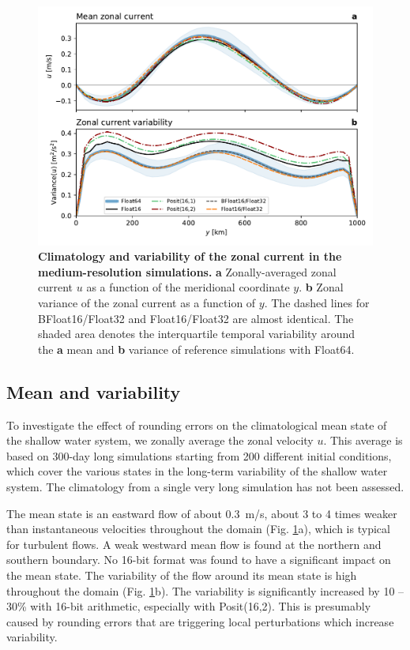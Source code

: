 \begin{figure}
\includegraphics[width=1\textwidth]{Figures/swm/meanvar_u.pdf}
\caption{\textbf{Climatology and variability of the zonal current in the medium-resolution simulations.} \textbf{a} Zonally-averaged zonal
current $u$ as a function of the meridional coordinate $y$. \textbf{b} Zonal variance of the zonal current as a function of $y$. The dashed
lines for BFloat16/Float32 and Float16/Float32 are almost identical. The shaded area denotes the interquartile temporal variability around
the \textbf{a} mean and \textbf{b} variance of reference simulations with Float64.}
\label{fig:mean}
\end{figure}

\subsection{Mean and variability}

To investigate the effect of rounding errors on the climatological mean state of the shallow water system, we zonally average the zonal
velocity $u$. This average is based on 300-day long simulations starting from 200 different initial conditions, which cover the various
states in the long-term variability of the shallow water system. The climatology from a single very long simulation has not been assessed.

The mean state is an eastward flow of about 0.3~m/s, about 3 to 4 times weaker than instantaneous velocities throughout the domain
(Fig. \ref{fig:mean}a), which is typical for turbulent flows. A weak westward mean flow is found at the northern and southern boundary. 
No 16-bit format was found to have a significant impact on the mean state. The variability of the flow around its mean state is high
throughout the domain (Fig. \ref{fig:mean}b). The variability is significantly increased by 10 -- 30\% with 16-bit arithmetic, especially with
Posit(16,2). This is presumably caused by rounding errors that are triggering local perturbations which increase variability.

